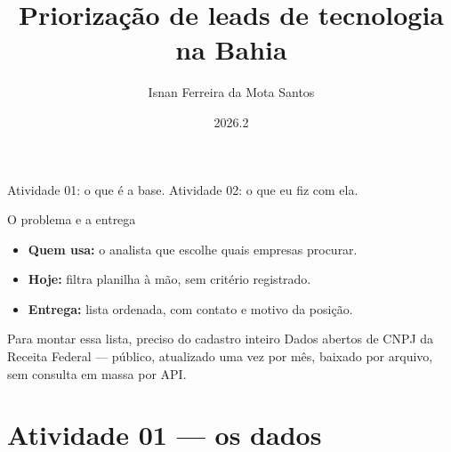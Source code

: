 \documentclass[aspectratio=169]{beamer}
\author{Isnan Ferreira da Mota Santos}
\title{Priorização de leads de tecnologia na Bahia}
\institute{PGCOMP/UFBA --- Sistemas Inteligentes Orientados a Dados}
\date{2026.2}
\begin{document}
\begin{frame}
    \titlepage
    \begin{center}
        \small Atividade 01: o que é a base. \quad Atividade 02: o que eu fiz com ela.
    \end{center}
\end{frame}

\begin{frame}{O problema e a entrega}
    \begin{itemize}
        \item \textbf{Quem usa:} o analista que escolhe quais empresas procurar.
        \item \textbf{Hoje:} filtra planilha à mão, sem critério registrado.
        \item \textbf{Entrega:} lista ordenada, com contato e motivo da posição.
    \end{itemize}

    \begin{block}{Para montar essa lista, preciso do cadastro inteiro}
        Dados abertos de CNPJ da Receita Federal --- público, atualizado uma
        vez por mês, baixado por arquivo, sem consulta em massa por API.
    \end{block}
\end{frame}

\section{Atividade 01 --- os dados}
\end{document}
